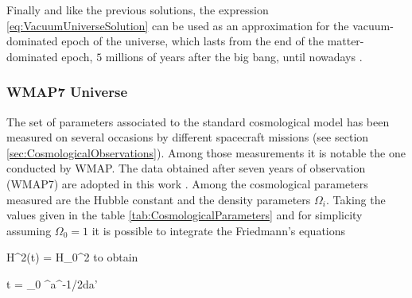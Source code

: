 Finally and like the previous solutions, the expression 
\ref{eq:VacuumUniverseSolution} can be used as an approximation for the
vacuum-dominated epoch of the universe, which lasts from the end of the
matter-dominated epoch, $5$ millions of years after the big bang, until 
nowadays \cite{longair2008}.



			\subsubsection*{WMAP7 Universe}
			
			
The set of parameters associated to the standard cosmological model has 
been measured on several occasions by different spacecraft missions (see
section \ref{sec:CosmologicalObservations}). Among those measurements it 
is notable the one conducted by WMAP. The data obtained after seven years
of observation (WMAP7) are adopted in this work \cite{WMAP7}. Among the 
cosmological parameters measured are the Hubble constant and the density
parameters $\Omega_i$. Taking the values given in the table 
\ref{tab:CosmologicalParameters} and for simplicity assuming $\Omega_0 = 1$
it is possible to integrate the Friedmann's equations

			
{ H^2(t) = H_0^2  }
to obtain


{ t = \int _0 ^{a}^{-1/2}da' }

